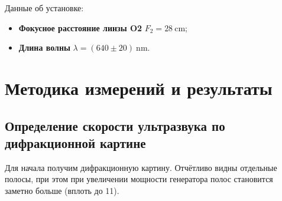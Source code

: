 \documentclass[12pt, a4paper]{article}
\begin{document}
Данные об установке:
\begin{itemize}
  \item \textbf{Фокусное расстояние линзы O2 }$F_2 = 28~\mathrm{cm}$;
  \item \textbf{Длина волны }$\lambda = (640\pm20)~\mathrm{nm}$.
\end{itemize}

\section{Методика измерений и результаты}
\subsection{Определение скорости ультразвука по дифракционной картине}
Для начала получим дифракционную картину. Отчётливо видны отдельные полосы, при этом при увеличении
мощности генератора полос становится заметно больше (вплоть до 11).
\end{document}
